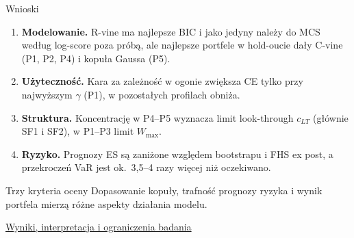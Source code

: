 \documentclass[aspectratio=169,11pt]{beamer}
\newcommand{\repo}{https://github.com/michalmarchwiak/bsc-project}
\newcommand{\rev}{9e941db56fde866672b262f5f6725268ce58feb7}
\newcommand{\src}[2]{\vfill{\scriptsize\color{Teal}%
  \href{\repo/blob/\rev/#1}{#2}}}
\begin{document}
\begin{frame}{Wnioski}
  \begin{enumerate}
    \item \textbf{Modelowanie.} R-vine ma najlepsze BIC i jako jedyny
      należy do MCS według log-score poza próbą, ale najlepsze portfele
      w hold-oucie dały C-vine (P1, P2, P4) i kopuła Gaussa (P5).
    \item \textbf{Użyteczność.} Kara za zależność w ogonie zwiększa CE
      tylko przy najwyższym \(\gamma\) (P1), w pozostałych profilach obniża.
    \item \textbf{Struktura.} Koncentrację w P4--P5 wyznacza limit
      look-through \(c_{LT}\) (głównie SF1 i SF2), w P1--P3 limit
      \(W_{\max}\).
    \item \textbf{Ryzyko.} Prognozy ES są zaniżone względem bootstrapu
      i FHS ex post, a przekroczeń VaR jest ok.\ 3,5--4 razy więcej
      niż oczekiwano.
  \end{enumerate}
  \begin{block}{Trzy kryteria oceny}
    Dopasowanie kopuły, trafność prognozy ryzyka i wynik portfela
    mierzą różne aspekty działania modelu.
  \end{block}
  \src{README.md}{Wyniki, interpretacja i ograniczenia badania}
\end{frame}
\end{document}
